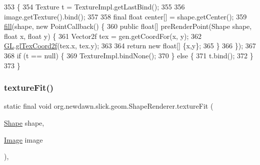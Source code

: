 \begin{DoxyCode}
353                                                                                                   \{
354         Texture t = TextureImpl.getLastBind();
355 
356         image.getTexture().bind();
357 
358         \textcolor{keyword}{final} \textcolor{keywordtype}{float} center[] = shape.getCenter();
359         \mbox{\hyperlink{classorg_1_1newdawn_1_1slick_1_1geom_1_1_shape_renderer_a798dd59aef1deb87fdfcc4fbff59ecef}{fill}}(shape, \textcolor{keyword}{new} PointCallback() \{
360             \textcolor{keyword}{public} \textcolor{keywordtype}{float}[] preRenderPoint(Shape shape, \textcolor{keywordtype}{float} x, \textcolor{keywordtype}{float} y) \{
361                 Vector2f tex = gen.getCoordFor(x, y);
362                 \mbox{\hyperlink{classorg_1_1newdawn_1_1slick_1_1geom_1_1_shape_renderer_a6116897ec2e7979b9ca9d406a4dfd566}{GL}}.\mbox{\hyperlink{interfaceorg_1_1newdawn_1_1slick_1_1opengl_1_1renderer_1_1_s_g_l_a5f661318cf9926c586a9837d0ded9fbd}{glTexCoord2f}}(tex.x, tex.y);
363 
364                 \textcolor{keywordflow}{return} \textcolor{keyword}{new} \textcolor{keywordtype}{float}[] \{x,y\};
365             \}
366         \});
367         
368         \textcolor{keywordflow}{if} (t == null) \{
369             TextureImpl.bindNone();
370         \} \textcolor{keywordflow}{else} \{
371             t.bind();
372         \}
373     \}
\end{DoxyCode}
\mbox{\label{classorg_1_1newdawn_1_1slick_1_1geom_1_1_shape_renderer_ad6d48583699bfb39ff6d17decbd03634}} 
\subsubsection{\texorpdfstring{texture\+Fit()}{textureFit()}\hspace{0.1cm}{\footnotesize\ttfamily [1/2]}}
{\footnotesize\ttfamily static final void org.\+newdawn.\+slick.\+geom.\+Shape\+Renderer.\+texture\+Fit (\begin{DoxyParamCaption}\item[{\mbox{\hyperlink{classorg_1_1newdawn_1_1slick_1_1geom_1_1_shape}{Shape}}}]{shape,  }\item[{\mbox{\hyperlink{classorg_1_1newdawn_1_1slick_1_1_image}{Image}}}]{image }\end{DoxyParamCaption})\hspace{0.3cm}{\ttfamily [inline]}, {\ttfamily [static]}}

